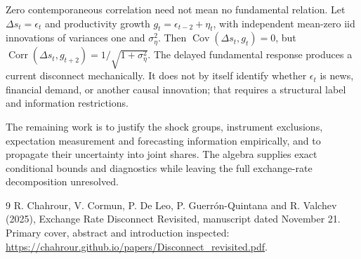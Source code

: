 \documentclass[11pt]{article}
\newcommand{\Cov}{\operatorname{Cov}}
\begin{document}
Zero contemporaneous correlation need not mean no fundamental relation. Let $\Delta s_t=\epsilon_t$ and productivity growth $g_t=\epsilon_{t-2}+\eta_t$, with independent mean-zero iid innovations of variances one and $\sigma_\eta^2$. Then $\Cov(\Delta s_t,g_t)=0$, but
$\operatorname{Corr}(\Delta s_t,g_{t+2})=1/\sqrt{1+\sigma_\eta^2}$.
The delayed fundamental response produces a current disconnect mechanically. It does not by itself identify whether $\epsilon_t$ is news, financial demand, or another causal innovation; that requires a structural label and information restrictions.

The remaining work is to justify the shock groups, instrument exclusions, expectation measurement and forecasting information empirically, and to propagate their uncertainty into joint shares. The algebra supplies exact conditional bounds and diagnostics while leaving the full exchange-rate decomposition unresolved.

\begin{thebibliography}{9}
 R. Chahrour, V. Cormun, P. De Leo, P. Guerr\'on-Quintana and R. Valchev (2025), Exchange Rate Disconnect Revisited, manuscript dated November 21. Primary cover, abstract and introduction inspected: \url{https://chahrour.github.io/papers/Disconnect_revisited.pdf}.
\end{thebibliography}
\end{document}

